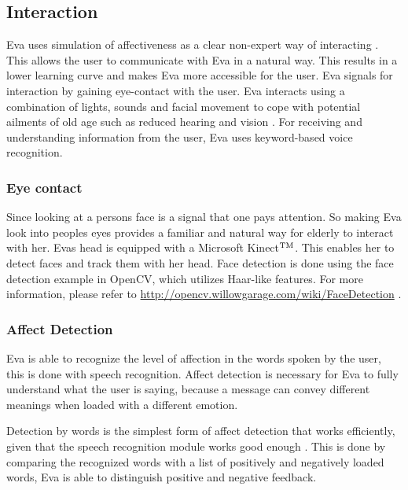 \documentclass[project_eva.tex]{subfiles}
\begin{document}
\subsection*{Interaction}
Eva uses simulation of affectiveness as a clear non-expert way of interacting \cite{Thomaz} . This allows the user to communicate with Eva in a natural way.  This results in a lower learning curve and makes Eva more accessible for the user. Eva signals for interaction by gaining eye-contact with the user. Eva interacts using a combination of lights, sounds and facial movement to cope with potential ailments of old age  such as reduced hearing and vision . For receiving and understanding information from the user, Eva uses keyword-based voice recognition. 

\subsubsection*{Eye contact}
Since looking at a person\textquotesingle s face is a signal that one pays attention. So making Eva look into 
people\textquotesingle s eyes provides a familiar and natural way for elderly to interact with her. 
Eva\textsinglequote s head is equipped with a Microsoft Kinect$\rm {}^{TM}$. This enables her to detect faces and track them with her head.  Face detection is done using the face detection example in OpenCV, which utilizes Haar-like features. 
For more information, please refer to \url{http://opencv.willowgarage.com/wiki/FaceDetection} \cite{FaceDetection} .

\subsubsection*{Affect Detection}
Eva is able to recognize the level of affection in the words spoken by the user, this is done with speech recognition. Affect detection is necessary for Eva to fully understand what the user is saying, because a message can convey different meanings when loaded with a different emotion.

Detection by words is the simplest form of affect detection that works efficiently, given that the speech recognition module works good enough \cite{affection} . This is done by comparing the recognized words with a list of positively and negatively loaded words, Eva is able to distinguish positive and negative feedback.
 
\end{document}
